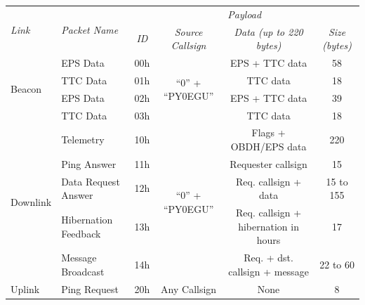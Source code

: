 \begin{landscape}
    \begin{table}[ht]
        \centering
        \begin{tabular}{llcccc}
            \toprule[1.5pt]
            \multirow{2}{*}{\textit{Link}} & \multirow{2}{*}{\textit{Packet Name}} & \multicolumn{4}{c}{\textit{Payload}} \\
            \cmidrule{3-6}
                                      &                       & \textit{ID}  & \textit{Source Callsign}   & \textit{Data (up to 220 bytes)}            & \textit{Size (bytes)} \\
            \midrule
            \multirow{4}{*}{Beacon}   & EPS Data              & 00h & \multirow{4}{*}{``0'' + ``PY0EGU''} & EPS + TTC data                             & 58           \\
                                      & TTC Data              & 01h &                                     & TTC data                                   & 18           \\
                                      & EPS Data              & 02h &                                     & EPS + TTC data                             & 39           \\
                                      & TTC Data              & 03h &                                     & TTC data                                   & 18           \\
            \midrule
            \multirow{5}{*}{Downlink} & Telemetry             & 10h & \multirow{5}{*}{``0'' + ``PY0EGU''} & Flags + OBDH/EPS data                      & 220          \\
                                      & Ping Answer           & 11h &                                     & Requester callsign                         & 15           \\
                                      & Data Request Answer   & 12h &                                     & Req. callsign + data                       & 15 to 155    \\
                                      & Hibernation Feedback  & 13h &                                     & Req. callsign + hibernation in hours       & 17           \\
                                      & Message Broadcast     & 14h &                                     & Req. + dst. callsign + message             & 22 to 60     \\
            \midrule
            \multirow{4}{*}{Uplink}   & Ping Request          & 20h & \multirow{4}{*}{Any Callsign}       & None                                       & 8            \\

\end{tabular}
\end{table}
\end{landscape}
